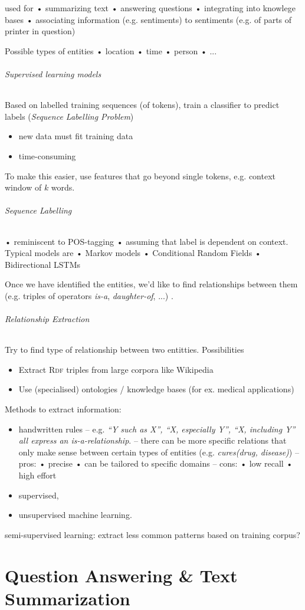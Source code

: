 \documentclass[10pt,twocolumn]{article}
\begin{document}
used for  • summarizing text  • answering questions  • integrating into knowlege
bases  • associating information (e.g. sentiments) to sentiments (e.g. of parts
of printer in question)

Possible types of entities  • location  • time  • person  • ...

\paragraph{\textit{Supervised learning models}} Based on labelled training
sequences (of tokens), train a classifier to predict labels (\textit{Sequence
  Labelling Problem})
\begin{itemize}
\item new data must fit training data
\item time-consuming
\end{itemize}

To make this easier, use features that go beyond single tokens, e.g. context
window of $k$ words.

\paragraph{\textit{Sequence Labelling}}  • reminiscent to POS-tagging  • assuming
that label is dependent on context. Typical models are  • Markov models  •
Conditional Random Fields  • Bidirectional LSTMs

Once we have identified the entities, we'd like to find relationships between
them (e.g. triples of operators \textit{is-a}, \textit{daughter-of}, ...)
.

\paragraph{\textit{Relationship Extraction}} Try to find type of relationship
between two entitties. Possibilities
\begin{itemize}
\item Extract \textsc{Rdf} triples from large corpora like Wikipedia
\item Use (specialised) ontologies / knowledge bases (for ex. medical applications)
\end{itemize}
Methods to extract information:
\begin{itemize}
\item handwritten rules -- e.g. \textit{``Y such as X'', ``X, especially Y'',
    ``X, including Y'' all express an \textit{is-a}-relationship}. -- there can
  be more specific relations that only make sense between certain types of
  entities (e.g. \textit{cures(drug, disease)}) -- pros:  • precise  • can be
  tailored to specific domains -- cons:  • low recall  • high effort
\item supervised,
\item unsupervised machine learning.
\end{itemize}

semi-supervised learning: extract less common patterns based on training corpus?






\pagebreak
\part{Question Answering \& Text Summarization}
\end{document}
